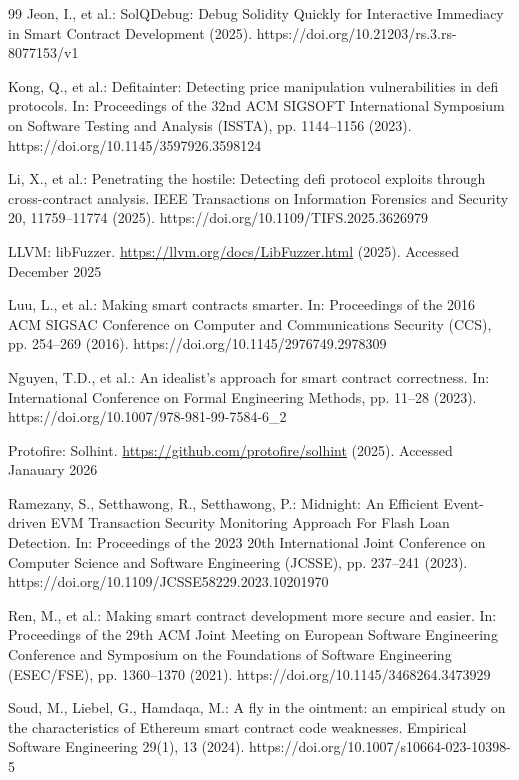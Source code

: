 \documentclass[pdflatex,sn-basic]{sn-jnl}%
\theoremstyle{thmstyleone}%
\theoremstyle{thmstyletwo}%
\theoremstyle{thmstylethree}%
\begin{document}
\begin{thebibliography}{99}
Jeon, I., et al.: SolQDebug: Debug Solidity Quickly for Interactive Immediacy in Smart Contract Development (2025). https://doi.org/10.21203/rs.3.rs-8077153/v1

Kong, Q., et al.: Defitainter: Detecting price manipulation vulnerabilities in defi protocols. In: Proceedings of the 32nd ACM SIGSOFT International Symposium on Software Testing and Analysis (ISSTA), pp. 1144--1156 (2023). https://doi.org/10.1145/3597926.3598124

Li, X., et al.: Penetrating the hostile: Detecting defi protocol exploits through cross-contract analysis. IEEE Transactions on Information Forensics and Security 20, 11759--11774 (2025). https://doi.org/10.1109/TIFS.2025.3626979

LLVM: libFuzzer. \url{https://llvm.org/docs/LibFuzzer.html} (2025). Accessed December 2025

Luu, L., et al.: Making smart contracts smarter. In: Proceedings of the 2016 ACM SIGSAC Conference on Computer and Communications Security (CCS), pp. 254--269 (2016). https://doi.org/10.1145/2976749.2978309

Nguyen, T.D., et al.: An idealist's approach for smart contract correctness. In: International Conference on Formal Engineering Methods, pp. 11--28 (2023). https://doi.org/10.1007/978-981-99-7584-6_2

Protofire: Solhint. \url{https://github.com/protofire/solhint} (2025). Accessed Janauary 2026

Ramezany, S., Setthawong, R., Setthawong, P.: Midnight: An Efficient Event-driven EVM Transaction Security Monitoring Approach For Flash Loan Detection. In: Proceedings of the 2023 20th International Joint Conference on Computer Science and Software Engineering (JCSSE), pp. 237--241 (2023). https://doi.org/10.1109/JCSSE58229.2023.10201970

Ren, M., et al.: Making smart contract development more secure and easier. In: Proceedings of the 29th ACM Joint Meeting on European Software Engineering Conference and Symposium on the Foundations of Software Engineering (ESEC/FSE), pp. 1360--1370 (2021). https://doi.org/10.1145/3468264.3473929

Soud, M., Liebel, G., Hamdaqa, M.: A fly in the ointment: an empirical study on the characteristics of Ethereum smart contract code weaknesses. Empirical Software Engineering 29(1), 13 (2024). https://doi.org/10.1007/s10664-023-10398-5


\end{thebibliography}
\end{document}
